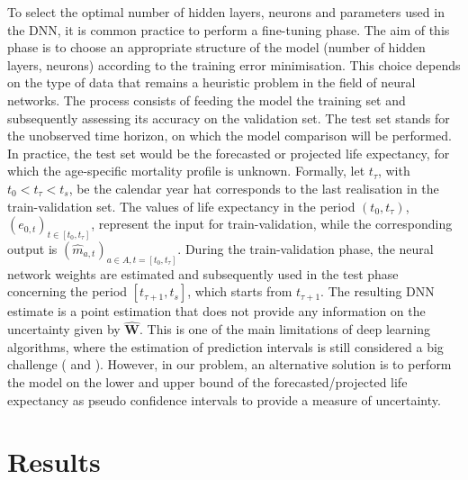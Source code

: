 \documentclass[a4,11pt]{article}
\begin{document}
To select the optimal number of hidden layers, neurons and parameters used in the DNN, it is common practice to perform a fine-tuning phase. The aim of this phase is to choose an appropriate structure of the model (number of hidden layers, neurons) according to the training error minimisation. This choice depends on the type of data that remains a heuristic problem in the field of neural networks. The process consists of feeding the model the training set and subsequently assessing its accuracy on the validation set. The test set stands for the unobserved time horizon, on which the model comparison will be performed. In practice, the test set would be the forecasted or projected life expectancy, for which the age-specific mortality profile is unknown. Formally, let $t_{\tau}$, with $t_0<t_{\tau}<t_s$, be the calendar year hat corresponds to the last realisation in the train-validation set. The values of life expectancy in the period $(t_0,t_{\tau})$, $(e_{0,t})_{t\in [t_{0},t_{\tau}]}$, represent the input for train-validation, while the corresponding output is $(\hat{m}_{a,t})_{a\in A,t=[t_{0},t_{\tau}]}$. During the train-validation phase, the neural network weights are estimated and subsequently used in the test phase concerning the period $[t_{\tau+1},t_{s}]$, which starts from $t_{\tau+1}$. The resulting DNN estimate is a point estimation that does not provide any information on the uncertainty given by $\hat{\mathbf{W}}$. This is one of the main limitations of deep learning algorithms, where the estimation of prediction intervals is still considered a big challenge (\cite{Khosravi} and \cite{Keren}). However, in our problem, an alternative solution is to perform the model on the lower and upper bound of the forecasted/projected life expectancy as pseudo confidence intervals to provide a measure of uncertainty.  

\section{Results}
\end{document}
